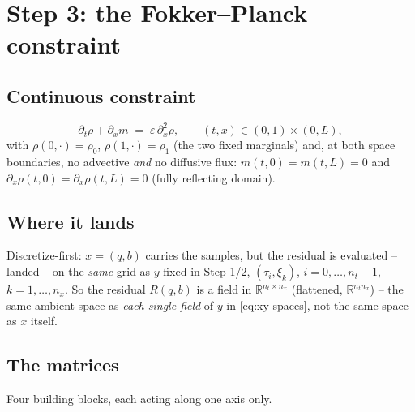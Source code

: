 \documentclass[11pt]{article}
\begin{document}
\section{Step 3: the Fokker--Planck constraint}
\label{sec:fp}

\subsection{Continuous constraint}

\begin{equation}
  \label{eq:fp-continuous}
  \partial_t \rho + \partial_x m \;=\; \varepsilon\,\partial_x^2\rho,
  \qquad (t,x)\in(0,1)\times(0,L),
\end{equation}
with $\rho(0,\cdot)=\rho_0$, $\rho(1,\cdot)=\rho_1$ (the two fixed marginals) and, at both
space boundaries, no advective \emph{and} no diffusive flux: $m(t,0)=m(t,L)=0$ and
$\partial_x\rho(t,0)=\partial_x\rho(t,L)=0$ (fully reflecting domain).

\subsection{Where it lands}

Discretize-first: $x=(q,b)$ carries the samples, but the residual is evaluated -- landed
-- on the \emph{same} grid as $y$ fixed in Step 1/2, $(\tau_i,\xi_k)$,
$i=0,\ldots,n_t{-}1$, $k=1,\ldots,n_x$. So the residual $R(q,b)$ is a field in
$\mathbb{R}^{n_t\times n_x}$ (flattened, $\mathbb{R}^{n_tn_x}$) -- the same ambient space
as \emph{each single field} of $y$ in \eqref{eq:xy-spaces}, not the same space as $x$
itself.

\subsection{The matrices}

Four building blocks, each acting along one axis only.
\end{document}
